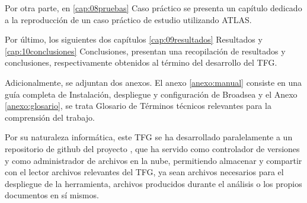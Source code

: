 Por otra parte, en \ref{cap:08pruebas} Caso práctico se presenta un capítulo dedicado a la reproducción de un caso práctico de estudio utilizando ATLAS. 

Por último, los siguientes dos capítulos \ref{cap:09resultados} Resultados y \ref{cap:10conclusiones} Conclusiones, presentan una recopilación de resultados y conclusiones, respectivamente obtenidos al término del desarrollo del TFG. 

Adicionalmente, se adjuntan dos anexos. El anexo \ref{anexo:manual} consiste en una guía completa de Instalación, despliegue y configuración de Broadsea y el Anexo \ref{anexo:glosario}, se trata Glosario de Términos técnicos relevantes para la comprensión del trabajo. 

Por su naturaleza informática, este TFG se ha desarrollado paralelamente a un repositorio de github del proyecto \cite{vallealonsodc}, que ha servido como controlador de versiones y como administrador de archivos en la nube, permitiendo almacenar y compartir con el lector archivos relevantes del TFG, ya sean archivos necesarios para el despliegue de la herramienta, archivos producidos durante el análisis o los propios documentos en sí mismos.

